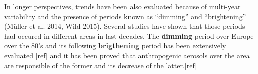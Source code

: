 


In longer perspectives, trends have been also evaluated because of multi-year variability and the presence of periods known as “dimming” and “brightening” (Müller et al. 2014, Wild 2015). Several studies have shown that those periods had occured in different areas in last decades. The \textbf{dimming} period over Europe over the 80's and its following \textbf{brigthening} period has been extensively evaluated [ref] and it has been proved that anthropogenic aerosols over the area are responsible of the former and its decrease of the latter.[ref]
 

